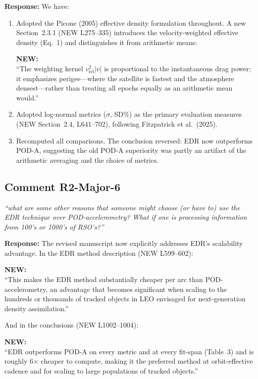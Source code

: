\documentclass[11pt]{article}
\newcommand{\reviewercomment}[1]{%
  \medskip
  \noindent\textit{\color{reviewblue}#1}%
  \medskip
}
\newcommand{\newtext}[1]{%
  \smallskip
  \noindent\hspace{1em}\begin{minipage}{0.92\textwidth}%
  \color{quotegreen}\textbf{NEW:}\\[2pt]``#1''%
  \end{minipage}%
  \smallskip
}
\begin{document}
\textbf{Response:}
We have:

\begin{enumerate}[nosep]
  \item Adopted the Picone (2005) effective density formulation throughout. A new Section~2.3.1 (NEW L275--335) introduces the velocity-weighted effective density (Eq.~1) and distinguishes it from arithmetic means:

  \newtext{The weighting kernel $v_\mathrm{rel}^2 |v|$ is proportional to the instantaneous drag power; it emphasizes perigee---where the satellite is fastest and the atmosphere densest---rather than treating all epochs equally as an arithmetic mean would.}

  \item Adopted log-normal metrics ($\sigma$, SD\%) as the primary evaluation measures (NEW Section~2.4, L641--702), following Fitzpatrick et al.\ (2025).

  \item Recomputed all comparisons. The conclusion reversed: EDR now outperforms POD-A, suggesting the old POD-A superiority was partly an artifact of the arithmetic averaging and the choice of metrics.
\end{enumerate}


\subsection{Comment R2-Major-6}

\reviewercomment{%
``what are some other reasons that someone might choose (or have to) use the EDR technique over POD-accelerometry? What if one is processing information from 100's or 1000's of RSO's?''}

\textbf{Response:}
The revised manuscript now explicitly addresses EDR's scalability advantage. In the EDR method description (NEW L599--602):

\newtext{This makes the EDR method substantially cheaper per arc than POD-accelerometry, an advantage that becomes significant when scaling to the hundreds or thousands of tracked objects in LEO envisaged for next-generation density assimilation.}

And in the conclusions (NEW L1002--1004):

\newtext{EDR outperforms POD-A on every metric and at every fit-span (Table~3) and is roughly 6$\times$ cheaper to compute, making it the preferred method at orbit-effective cadence and for scaling to large populations of tracked objects.}
\end{document}

